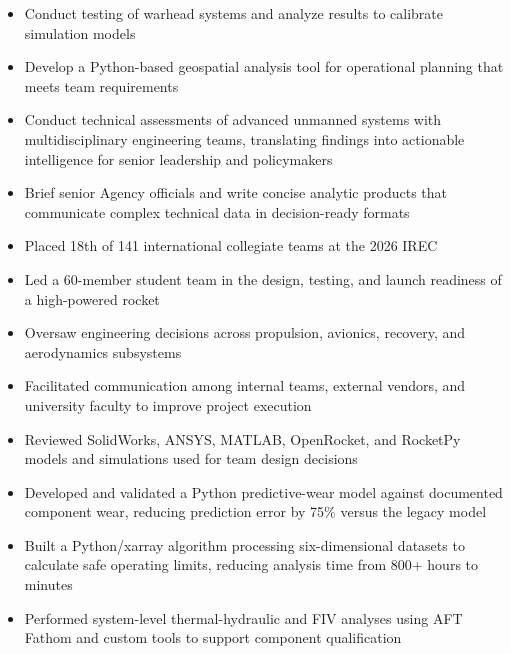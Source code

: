 \documentclass[10pt,letterpaper]{article}
\begin{document}
\resumeHeader
{}


\begin{itemize}
  \item Conduct testing of warhead systems and analyze results to calibrate simulation models
  \item Develop a Python-based geospatial analysis tool for operational planning that meets team requirements
  \item Conduct technical assessments of advanced unmanned systems with multidisciplinary engineering teams, translating findings into actionable intelligence for senior leadership and policymakers
  \item Brief senior Agency officials and write concise analytic products that communicate complex technical data in decision-ready formats
\end{itemize}

\vspace{2pt}
\earlierRoles
\begin{itemize}
  \item Placed 18th of 141 international collegiate teams at the 2026 IREC
  \item Led a 60-member student team in the design, testing, and launch readiness of a high-powered rocket
  \item Oversaw engineering decisions across propulsion, avionics, recovery, and aerodynamics subsystems
  \item Facilitated communication among internal teams, external vendors, and university faculty to improve project execution
  \item Reviewed SolidWorks, ANSYS, MATLAB, OpenRocket, and RocketPy models and simulations used for team design decisions
\end{itemize}

\vspace{2pt}
\begin{itemize}
  \item Developed and validated a Python predictive-wear model against documented component wear, reducing prediction error by 75\% versus the legacy model
  \item Built a Python/xarray algorithm processing six-dimensional datasets to calculate safe operating limits, reducing analysis time from 800+ hours to minutes
  \item Performed system-level thermal-hydraulic and FIV analyses using AFT Fathom and custom tools to support component qualification
\end{itemize}
\end{document}
